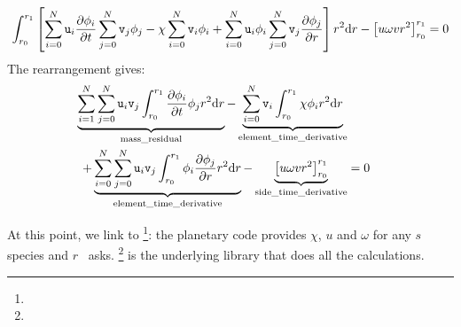 \begin{equation}
 \int_{r_0}^{r_1}\left[
                  \sum_{i=0}^{N}\mathtt{u}_i\frac{\partial\phi_i}{\partial t} \sum_{j=0}^{N}\mathtt{v}_j \phi_j
                 - \chi \sum_{i=0}^{N}\mathtt{v}_i\phi_i 
                 + \sum_{i=0}^{N}\mathtt{u}_i\phi_i\sum_{j=0}^{N}\mathtt{v}_j\frac{\partial\phi_j}{\partial r}\right]r^2\mathrm{d} r
 - \left[u\omega v r^2\right]_{r_0}^{r_1} = 0
\end{equation}
The rearrangement gives:
\begin{equation}
\begin{split}
  \underbrace{\sum_{i=1}^{N}\sum_{j=0}^{N}\mathtt{u}_i\mathtt{v}_j\int_{r_0}^{r_1}\frac{\partial\phi_i}{\partial t}\phi_jr^2\mathrm{d} r}_\text{mass\_residual}
- \underbrace{\sum_{i=0}^{N}\mathtt{v}_i\int_{r_0}^{r_1}\chi\phi_i r^2\mathrm{d} r}_\text{element\_time\_derivative} \\
+ \underbrace{\sum_{i=0}^{N}\sum_{j=0}^{N}\mathtt{u}_i\mathtt{v}_j\int_{r_0}^{r_1}\phi_i\frac{\partial\phi_j}{\partial r}r^2\mathrm{d} r}_\text{element\_time\_derivative}
 - \underbrace{\left[u\omega v r^2\right]_{r_0}^{r_1}}_\text{side\_time\_derivative}  & = 0
\end{split}
\end{equation}


At this point, we link to \GRINS\footnote{\GitGrins}: the planetary code provides $\chi$, $u$ and
$\omega$ for any $s$ species and $r$ \GRINS\ asks. \LibMesh\footnote{\GitLibmesh} is the underlying library that
does all the calculations.

